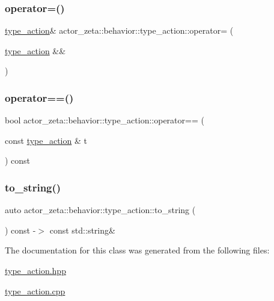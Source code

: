 \subsubsection{\texorpdfstring{operator=()}{operator=()}\hspace{0.1cm}{\footnotesize\ttfamily [2/2]}}
{\footnotesize\ttfamily \hyperlink{classactor__zeta_1_1behavior_1_1type__action}{type\+\_\+action}\& actor\+\_\+zeta\+::behavior\+::type\+\_\+action\+::operator= (\begin{DoxyParamCaption}\item[{\hyperlink{classactor__zeta_1_1behavior_1_1type__action}{type\+\_\+action} \&\&}]{ }\end{DoxyParamCaption})\hspace{0.3cm}{\ttfamily [default]}}

\mbox{\label{classactor__zeta_1_1behavior_1_1type__action_a852901cc2a9a35ede73535701e28eda2}} 
\subsubsection{\texorpdfstring{operator==()}{operator==()}}
{\footnotesize\ttfamily bool actor\+\_\+zeta\+::behavior\+::type\+\_\+action\+::operator== (\begin{DoxyParamCaption}\item[{const \hyperlink{classactor__zeta_1_1behavior_1_1type__action}{type\+\_\+action} \&}]{t }\end{DoxyParamCaption}) const\hspace{0.3cm}{\ttfamily [noexcept]}}

\mbox{\label{classactor__zeta_1_1behavior_1_1type__action_aea8bf387fe61053322c0862f0f7c7f09}} 
\subsubsection{\texorpdfstring{to\+\_\+string()}{to\_string()}}
{\footnotesize\ttfamily auto actor\+\_\+zeta\+::behavior\+::type\+\_\+action\+::to\+\_\+string (\begin{DoxyParamCaption}{ }\end{DoxyParamCaption}) const -\/$>$ const std\+::string\&}



The documentation for this class was generated from the following files\+:\begin{DoxyCompactItemize}
\item 
\hyperlink{type__action_8hpp}{type\+\_\+action.\+hpp}\item 
\hyperlink{type__action_8cpp}{type\+\_\+action.\+cpp}\end{DoxyCompactItemize}
